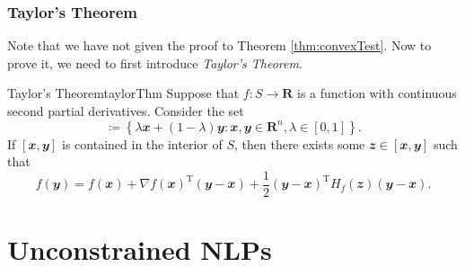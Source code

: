 \documentclass[math]{amznotes}
\theoremstyle{remark}
\begin{document}
\subsection{Taylor's Theorem}
Note that we have not given the proof to Theorem \ref{thm:convexTest}. Now to prove it, we need to first introduce \textit{Taylor's Theorem}.
\begin{thmbox}{Taylor's Theorem}{taylorThm}
    Suppose that $f \colon S \to \mathbf{R}$ is a function with continuous second partial derivatives. Consider the set
    \begin{displaymath}
        [\mathbfit{x}, \mathbfit{y}] \coloneqq \left\{\lambda\mathbfit{x} + (1 - \lambda)\mathbfit{y} \colon \mathbfit{x}, \mathbfit{y} \in \mathbf{R}^n, \lambda \in [0, 1]\right\}.
    \end{displaymath}
    If $[\mathbfit{x}, \mathbfit{y}]$ is contained in the interior of $S$, then there exists some $\mathbfit{z} \in [\mathbfit{x}, \mathbfit{y}]$ such that
    \begin{equation*}
        f(\mathbfit{y}) = f(\mathbfit{x}) + \nabla f(\mathbfit{x})^{\mathrm{T}}(\mathbfit{y - x}) + \frac{1}{2}(\mathbfit{y - x})^{\mathrm{T}}H_f(\mathbfit{z})(\mathbfit{y - x}).
    \end{equation*}
\end{thmbox}
\chapter{Unconstrained NLPs}
\end{document}
